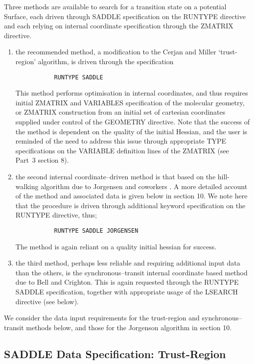 \documentclass[11pt,fleqn]{article}
\begin{document}
Three methods are available to search for a transition state on
a potential Surface, each driven through SADDLE specification on the
RUNTYPE directive and each relying on internal coordinate 
specification through the ZMATRIX directive.
\begin{enumerate}
\item the recommended method, a modification to the Cerjan and Miller
`trust-region' algorithm, is driven through the specification

{
\footnotesize
\begin{verbatim}
           RUNTYPE SADDLE
\end{verbatim}
}
This method performs optimisation in internal coordinates, 
and thus requires initial ZMATRIX and VARIABLES specification of the 
molecular geometry, or ZMATRIX construction from an initial set
of cartesian coordinates supplied under control of the
GEOMETRY directive. Note that the success of the method
is dependent on the quality of the initial Hessian, and
the user is reminded of the need to address this issue through
appropriate TYPE specifications on the VARIABLE definition lines
of the ZMATRIX (see Part~3 section 8).
\item the second internal coordinate--driven method is that 
based on the hill-walking algorithm due  to
Jorgensen and coworkers \cite{simons}. 
A more detailed account of
the method and associated data is given below in section 10. We note
here that the procedure is driven through additional keyword
specification on the RUNTYPE directive, thus;

{
\footnotesize
\begin{verbatim}
           RUNTYPE SADDLE JORGENSEN
\end{verbatim}
}
The method is again reliant on a quality initial hessian
for success.
\item the third method, perhaps less reliable and requiring
additional input data than the
others, is the synchronous--transit internal coordinate based 
method due to Bell and Crighton. This is again requested
through the  RUNTYPE SADDLE specification, together with
appropriate usage of the LSEARCH directive (see below).
\end{enumerate}
We consider the data input requirements for the trust-region and
synchronous--transit methods below, and those for the Jorgenson
algorithm in section 10.

\subsection[SADDLE Data Specification: Trust-Region]{SADDLE Data Specification: Trust-Region}
\end{document}
